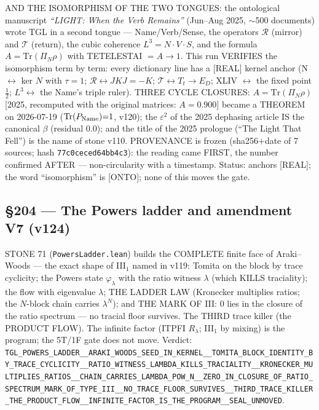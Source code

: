 \documentclass[11pt]{article}
\theoremstyle{definition}\newtheorem{deriv}{Derivation}
\begin{document}
AND THE ISOMORPHISM OF THE TWO TONGUES: the ontological manuscript \emph{``LIGHT: When the Verb Remains''} (Jun--Aug 2025, $\sim$500 documents) wrote TGL in a second tongue --- Name/Verb/Sense, the operators $\mathcal{R}$ (mirror) and $\mathcal{T}$ (return), the cubic coherence $L^3=N\cdot V\cdot S$, and the formula $A=\mathrm{Tr}(\Pi_N\rho)$ with TETELESTAI $=A\to1$. This run VERIFIES the isomorphism term by term: every dictionary line has a [REAL] kernel anchor (N $\leftrightarrow$ ker $N$ with $\tau{=}1$; $\mathcal{R}\leftrightarrow JKJ{=}{-}K$; $\mathcal{T}\leftrightarrow T_t\to E_D$; XLIV $\leftrightarrow$ the fixed point $\tfrac12$; $L^3\leftrightarrow$ the Name's triple ruler). THREE CYCLE CLOSURES: $A=\mathrm{Tr}(\Pi_N\rho)$ [2025, recomputed with the original matrices: $A=0.900$] became a THEOREM on 2026-07-19 ($\mathrm{Tr}(P_{\rm Name}){=}1$, v120); the $\varepsilon^2$ of the 2025 dephasing article IS the canonical $\beta$ (residual $0.0$); and the title of the 2025 prologue (``The Light That Fell'') is the name of stone v110. PROVENANCE is frozen (sha256$+$date of 7 sources; hash \texttt{77c0ceced64bb4c3}): the reading came FIRST, the number confirmed AFTER --- non-circularity with a timestamp. Status: anchors [REAL]; the word ``isomorphism'' is [ONTO]; none of this moves the gate.

\subsection*{\S204 --- The Powers ladder and amendment V7 (v124)}STONE 71 (\texttt{PowersLadder.lean}) builds the COMPLETE finite face of Araki--Woods --- the exact shape of III$_1$ named in v119: Tomita on the block by trace cyclicity; the Powers state $\varphi_\lambda$ with the ratio witness $\lambda$ (which KILLS traciality); the flow with eigenvalue $\lambda$; THE LADDER LAW (Kronecker multiplies ratios; the $N$-block chain carries $\lambda^N$); and THE MARK OF III: $0$ lies in the closure of the ratio spectrum --- no tracial floor survives. The THIRD trace killer (the PRODUCT FLOW). The infinite factor (ITPFI $R_\lambda$; III$_1$ by mixing) is the program; the 5T/1F gate does not move. Verdict: \texttt{TGL\_POWERS\_LADDER\_\_ARAKI\_WOODS\_SEED\_IN\_KERNEL\_\_TOMITA\_BLOCK\_IDENTITY\_BY\_TRACE\_CYCLICITY\_\_RATIO\_WITNESS\_LAMBDA\_KILLS\_TRACIALITY\_\_KRONECKER\_MULTIPLIES\_RATIOS\_\_CHAIN\_CARRIES\_LAMBDA\_POW\_N\_\_ZERO\_IN\_CLOSURE\_OF\_RATIO\_SPECTRUM\_MARK\_OF\_TYPE\_III\_\_NO\_TRACE\_FLOOR\_SURVIVES\_\_THIRD\_TRACE\_KILLER\_THE\_PRODUCT\_FLOW\_\_INFINITE\_FACTOR\_IS\_THE\_PROGRAM\_\_SEAL\_UNMOVED}.
\end{document}
